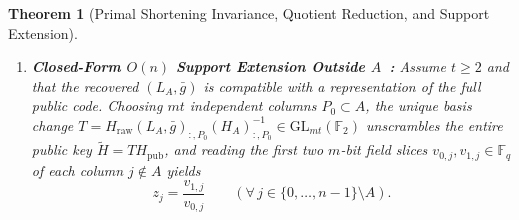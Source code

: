 \documentclass[11pt,a4paper]{article}
\newtheorem{theorem}{Theorem}
\theoremstyle{definition}
\theoremstyle{remark}
\newcommand{\F}{\mathbb{F}}
\begin{document}
\begin{theorem}[Primal Shortening Invariance, Quotient Reduction, and Support Extension]
\begin{enumerate}[leftmargin=2em]
    \item \textbf{Closed-Form $O(n)$ Support Extension Outside $A$~\cite{KM23}:}
    Assume $t \ge 2$ and that the recovered $(L_A, \bar{g})$ is compatible with a representation of the full public code. Choosing $mt$ independent columns $P_0 \subset A$, the unique basis change $T = H_{\text{raw}}(L_A, \bar{g})_{:, P_0} (H_A)_{:, P_0}^{-1} \in \mathrm{GL}_{mt}(\F_2)$ unscrambles the entire public key $\widetilde{H} = T H_{\text{pub}}$, and reading the first two $m$-bit field slices $v_{0, j}, v_{1, j} \in \F_q$ of each column $j \notin A$ yields~\cite{KM23,Ved26,Wei26,Saa26a,Saa26b}
    \begin{equation}
    \label{eq:support-ext}
        z_j = \frac{v_{1, j}}{v_{0, j}} \qquad (\forall\, j \in \{0, \dots, n-1\} \setminus A).
    \end{equation}
\end{enumerate}
\end{theorem}
\end{document}
